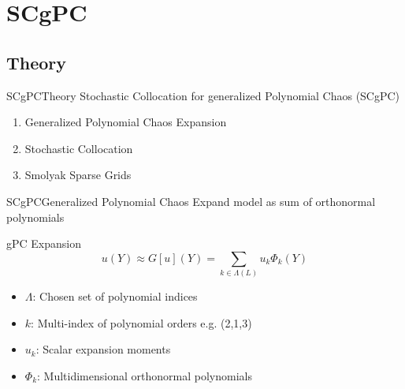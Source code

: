 \documentclass{beamer}
\begin{document}
\AtBeginSubsection[]
{\begin{frame}[shrink=20,noframenumbering]{Outline}\vspace{-20pt}
  \begin{columns}
    \begin{column}{0.1\textwidth}
    \end{column}
    \begin{column}{0.9\textwidth}
      \setcounter{tocdepth}{2}
      \tableofcontents[currentsection,currentsubsection,subsectionstyle=show/shaded/hide]%
    \end{column}
  \end{columns}
\end{frame}
}






\section{SCgPC}
\subsection{Theory}
\begin{frame}{SCgPC}{Theory}\vspace{-20pt}
  \vfill
  Stochastic Collocation for generalized Polynomial Chaos (SCgPC)
  \vfill
  \begin{enumerate}
    \item Generalized Polynomial Chaos Expansion
  \vfill
    \item Stochastic Collocation
  \vfill
    \item Smolyak Sparse Grids
  \end{enumerate}
  \vfill
\end{frame}

\begin{frame}{SCgPC}{Generalized Polynomial Chaos}\vspace{-20pt}
  \vfill
  Expand model as sum of orthonormal polynomials
  \vfill
  \begin{block}{gPC Expansion}
    \begin{equation*}
    u(Y) \approx G[u](Y) = \sum_{k\in\Lambda(L)} u_k \Phi_k(Y)
    \end{equation*}
  \end{block}
  \vfill
  \begin{itemize}
    \item $\Lambda$: Chosen set of polynomial indices
    \item $k$: Multi-index of polynomial orders e.g. (2,1,3)
    \item $u_k$: Scalar expansion moments
    \item $\Phi_k$: Multidimensional orthonormal polynomials
  \end{itemize}
  \vfill
\end{frame}
\end{document}
